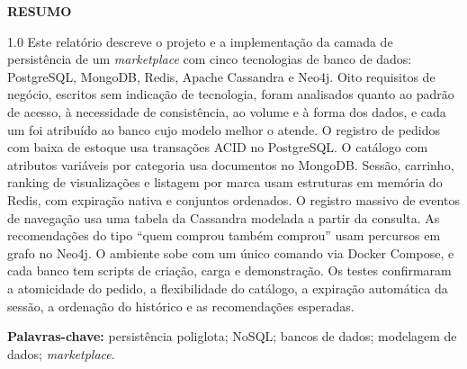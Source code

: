 \documentclass[12pt,a4paper,oneside]{article}
\begin{document}
\newpage\thispagestyle{semnum}
\begin{center}{\bfseries\MakeUppercase{Resumo}}\end{center}
\vspace{\baselineskip}
\begin{spacing}{1.0}
\noindent Este relatório descreve o projeto e a implementação da camada de persistência de um \textit{marketplace} com cinco tecnologias de banco de dados: PostgreSQL, MongoDB, Redis, Apache Cassandra e Neo4j. Oito requisitos de negócio, escritos sem indicação de tecnologia, foram analisados quanto ao padrão de acesso, à necessidade de consistência, ao volume e à forma dos dados, e cada um foi atribuído ao banco cujo modelo melhor o atende. O registro de pedidos com baixa de estoque usa transações ACID no PostgreSQL. O catálogo com atributos variáveis por categoria usa documentos no MongoDB. Sessão, carrinho, ranking de visualizações e listagem por marca usam estruturas em memória do Redis, com expiração nativa e conjuntos ordenados. O registro massivo de eventos de navegação usa uma tabela da Cassandra modelada a partir da consulta. As recomendações do tipo ``quem comprou também comprou'' usam percursos em grafo no Neo4j. O ambiente sobe com um único comando via Docker Compose, e cada banco tem scripts de criação, carga e demonstração. Os testes confirmaram a atomicidade do pedido, a flexibilidade do catálogo, a expiração automática da sessão, a ordenação do histórico e as recomendações esperadas.

\vspace{\baselineskip}
\noindent\textbf{Palavras-chave:} persistência poliglota; NoSQL; bancos de dados; modelagem de dados; \textit{marketplace}.
\end{spacing}
\end{document}
